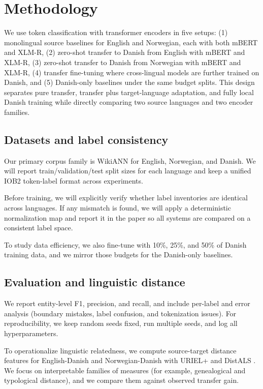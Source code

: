 \documentclass[11pt]{article}
\begin{document}
\section{Methodology}
We use token classification with transformer encoders in five setups: (1) monolingual source baselines for English and Norwegian, each with both mBERT and XLM-R, (2) zero-shot transfer to Danish from English with mBERT and XLM-R, (3) zero-shot transfer to Danish from Norwegian with mBERT and XLM-R, (4) transfer fine-tuning where cross-lingual models are further trained on Danish, and (5) Danish-only baselines under the same budget splits. This design separates pure transfer, transfer plus target-language adaptation, and fully local Danish training while directly comparing two source languages and two encoder families.

\subsection{Datasets and label consistency}
Our primary corpus family is WikiANN for English, Norwegian, and Danish. We will report train/validation/test split sizes for each language and keep a unified IOB2 token-label format across experiments.

Before training, we will explicitly verify whether label inventories are identical across languages. If any mismatch is found, we will apply a deterministic normalization map and report it in the paper so all systems are compared on a consistent label space.

To study data efficiency, we also fine-tune with 10\%, 25\%, and 50\% of Danish training data, and we mirror those budgets for the Danish-only baselines.

\subsection{Evaluation and linguistic distance}
We report entity-level F1, precision, and recall, and include per-label and error analysis (boundary mistakes, label confusion, and tokenization issues). For reproducibility, we keep random seeds fixed, run multiple seeds, and log all hyperparameters.

To operationalize linguistic relatedness, we compute source-target distance features for English-Danish and Norwegian-Danish with URIEL+ \citep{khan2025urielplus} and DistALS \citep{goot2025distals}. We focus on interpretable families of measures (for example, genealogical and typological distance), and we compare them against observed transfer gain.
\end{document}
